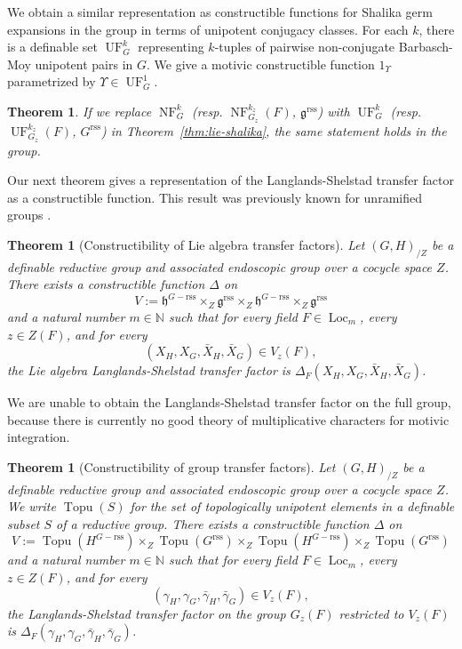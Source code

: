 \documentclass[12pt]{amsart}
\newcommand{\op}[1]{\operatorname{#1}}
\newcommand{\ring}[1]{{\mathbb #1}}
\def\NF{\op{NF}}
\def\UF{\op{UF}}
\def\Y{\Upsilon}
\newcommand{\fg}{\mathfrak{g}}
\newcommand{\fh}{\mathfrak{h}}
\newcommand{\reg}{\mathrm{rss}}
\theoremstyle{plain}
\newtheorem{theorem}[thm]{Theorem}
\theoremstyle{definition}
\begin{document}
We obtain a similar representation as constructible functions for
Shalika germ expansions in the group in terms of unipotent conjugacy
classes.  For each $k$, there is a definable set $\UF^k_G$
representing $k$-tuples of pairwise non-conjugate Barbasch-Moy
unipotent pairs in $G$.  We give a motivic constructible function
$1_\Y$ parametrized by $\Y\in \UF^1_G$.

\begin{theorem} If we replace $\NF^k_G$ (resp. $\NF^{k_z}_{G_z}(F)$,
  $\fg^\reg$) with $\UF^k_{G}$ (resp. $\UF^{k_z}_{G_z}(F)$, $G^\reg$)
  in Theorem~\ref{thm:lie-shalika}, the same statement holds in the
  group.
\end{theorem}

Our next theorem gives a representation of the Langlands-Shelstad
transfer factor as a constructible function.  This result was
previously known for unramified groups \cite{CHL}.

\begin{theorem}[Constructibility of Lie algebra transfer
  factors]\label{thm:xfer-factor} 
Let
  $(G,H)_{/Z}$ be a definable reductive group and associated
  endoscopic group over a cocycle space $Z$.  There exists a
  constructible function $\Delta$ on
\begin{equation}\label{eqn:delta-domain}
V := \fh^{G-\reg}\times_Z
  \fg^\reg\times_Z
\fh^{G-\reg}\times_Z
  \fg^\reg
\end{equation}
and a natural number $m\in \ring{N}$ such that for every field $F\in
\op{Loc}_{m}$, every $z\in Z(F)$, and for every 
\[
(X_H,X_G,\bar X_H,\bar X_G)\in
V_z(F),\]  
the Lie algebra Langlands-Shelstad transfer factor is
$\Delta_F(X_H,X_G,\bar X_H,\bar X_G)$.
\end{theorem}

We are unable to obtain the Langlands-Shelstad
transfer factor on the full group, because there is currently no good
theory of multiplicative characters for motivic integration.

\begin{theorem}[Constructibility of group transfer factors] Let
  $(G,H)_{/Z}$ be a definable reductive group and associated
  endoscopic group over a cocycle space $Z$.  We write $\op{Topu}(S)$
  for the set of topologically unipotent elements in a definable
  subset $S$ of a reductive group.  There exists a constructible
  function $\Delta$ on
\[
V := \op{Topu}(H^{G-\reg})\times_Z
  \op{Topu}(G^\reg)\times_Z
\op{Topu}(H^{G-\reg})\times_Z
  \op{Topu}(G^\reg)
\] 
and a natural number $m\in \ring{N}$ such that for every field $F\in
\op{Loc}_{m}$, every $z\in Z(F)$, and for every 
\[
(\gamma_H,\gamma_G,\bar \gamma_H,\bar \gamma_G)\in V_z(F),\] the
Langlands-Shelstad transfer factor on the group $G_z(F)$ restricted to
$V_z(F)$ is $\Delta_F(\gamma_H,\gamma_G,\bar \gamma_H,\bar
\gamma_G)$.
\end{theorem}
\end{document}
